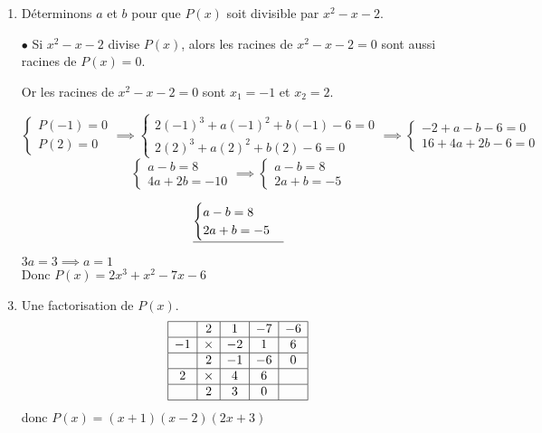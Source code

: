 \documentclass[12pt,a4paper]{article}
\begin{document}
\begin{enumerate}
    \item Déterminons \( a \) et \( b \) pour que \( P(x) \) soit divisible par \( x^2 - x - 2 \).

    \item[\( \bullet \)] Si \( x^2 - x - 2 \) divise \( P(x) \), alors les racines de \( x^2 - x - 2 = 0 \) sont aussi racines de \( P(x) = 0 \).

Or les racines de \( x^2 - x - 2 = 0 \) sont \( x_1 = -1 \) et \( x_2 = 2 \).

\[
\begin{cases}
P(-1) = 0 \\
P(2) = 0
\end{cases}\implies 
\begin{cases}
2(-1)^3 + a(-1)^2 + b(-1) - 6 = 0 \\
2(2)^3 + a(2)^2 + b(2) - 6 = 0 
\end{cases}\implies 
\begin{cases}
-2 + a - b - 6 = 0 \\
16 + 4a + 2b - 6 = 0
\end{cases}
\]
\[
\begin{cases}
a - b  = 8 \\
4a + 2b = -10
\end{cases}\implies 
\begin{cases}
a - b  = 8 \\
2a + b = -5
\end{cases}
\]

\[
\underline{
\begin{cases}
a - b  = 8 \\
2a + b = -5
\end{cases}
}\\
\]
\begin{center}
$3a=3 \implies a=1$\\
Donc \( P(x) = 2x^3 + x^2 - 7x - 6 \)
\end{center}
\item Une factorisation de \( P(x) \).
\[
\begin{array}{|c|c|c|c|c|}
\hline
 & 2 & 1 & -7 & -6  \\ 
\hline
-1 & \times & -2 & 1 & 6 \\ 
\hline
 & 2 & -1 & -6 & 0  \\
\hline
2 & \times & 4 & 6 &  \\ 
\hline
& 2 & 3 & 0 &   \\
\hline
\end{array}
\]
donc \( P(x) = (x+1)(x-2)(2x+3) \)


\end{enumerate}
\end{document}
